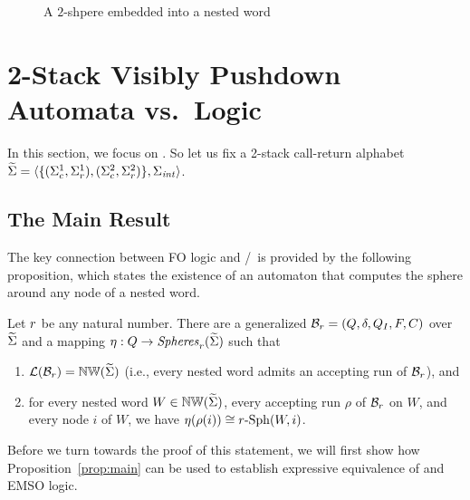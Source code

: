 \documentclass{LMCS}
\begin{document}
\begin{figure}[t]
\begin{center}
{\begin{picture}
\end{picture}
}
\caption{A $2$-shpere embedded into a nested word\label{fig:embedding}}
\end{center}
\end{figure}













\section{2-Stack Visibly Pushdown Automata vs.\ Logic}\label{sec:EMSO}

\label{sec:maintheorem}





In this section, we focus on \tVPA. So let us fix a 2-stack call-return
alphabet
$\crSigma=\langle\{(\cSigma^1,\rSigma^1),(\cSigma^2,\rSigma^2)\},\intSigma\rangle$.

\subsection{The Main Result}

\label{subsect:maintheorem}
The key connection between FO logic and \tVPA/\tNWA~is provided by the
following proposition, which states the existence of an automaton that
computes the sphere around any node of a nested word.

\begin{prop}\label{prop:main}
  Let $\radius$ be any natural number. There are a generalized \tNWA
  $\WA_\radius=(Q,\delta,\Init,F,C)$ over $\crSigma$ and a mapping $\eta: Q
  \rightarrow \AllSpheres_\radius(\crSigma)$ such that
\begin{enumerate}[$\bullet$]
\item $\Lang(\WA_\radius) = \NW(\crSigma)$ (i.e., every nested word admits an
  accepting run of $\WA_\radius$), and
\item for every nested word $W \in \NW(\crSigma)$, every accepting run $\rho$
  of $\WA_\radius$ on $W$, and every node $i$ of $W$, we have $\eta(\rho(i))
  \isom \Sph{\radius}{W}{i}$.
\end{enumerate}
\end{prop}



Before we turn towards the proof of this statement, we will first show how
Proposition~\ref{prop:main} can be used to establish expressive equivalence of
\tVPA and EMSO logic.
\end{document}
